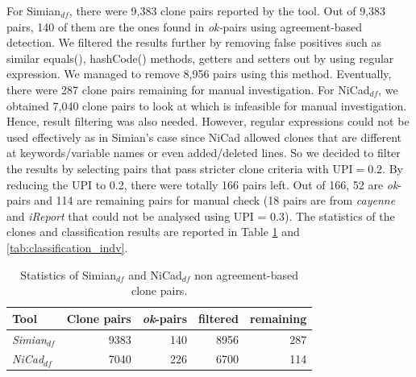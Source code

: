\documentclass{sig-alternate-05-2015}
\begin{document}
For Simian$_{df}$, there were 9,383 clone pairs reported by the tool. Out of 9,383 pairs, 140 of them are the ones found in \textit{ok-}pairs using agreement-based detection. We filtered the results further by removing false positives such as similar equals(), hashCode() methods, getters and setters out by using regular expression. We managed to remove 8,956 pairs using this method. Eventually, there were 287 clone pairs remaining for manual investigation. For NiCad$_{df}$, we obtained 7,040 clone pairs to look at which is infeasible for manual investigation. Hence, result filtering was also needed. However, regular expressions could not be used effectively as in Simian's case since NiCad allowed clones that are different at keywords/variable names or even added/deleted lines. So we decided to filter the results by selecting pairs that pass stricter clone criteria with $\mathrm{UPI} = 0.2$. By reducing the UPI to 0.2, there were totally 166 pairs left. Out of 166, 52 are \textit{ok}-pairs and 114 are remaining pairs for manual check (18 pairs are from \textit{cayenne} and \textit{iReport} that could not be analysed using UPI = 0.3). The statistics of the clones and classification results are reported in Table \ref{tab:classification_indv_stats} and \ref{tab:classification_indv}.


\begin{table}
	\centering
	\caption{Statistics of Simian$_{df}$ and NiCad$_{df}$ non agreement-based clone pairs.}
	\label{tab:classification_indv_stats}
	\small
	\begin{tabular}{l|r|r|r|r}
		\hline 
		Tool & Clone pairs & \textit{ok}-pairs & filtered & remaining \\ 
		\hline 
		\multirow{1}{*}{\textit{Simian$_{df}$}} & 9383 & 140 & 8956 & 287 \\
		\hline
		\multirow{1}{*}{\textit{NiCad$_{df}$}} & 7040  & 226 & 6700 & 114 \\
		\hline
	\end{tabular} 
\end{table}
\end{document}
